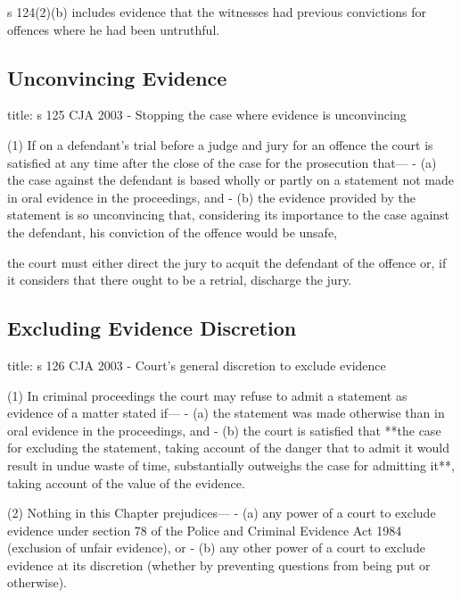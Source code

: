 \documentclass[
]{article}
\newenvironment{Shaded}{}{}
\newcommand{\NormalTok}[1]{#1}
\begin{document}
s 124(2)(b) includes evidence that the witnesses had previous
convictions for offences where he had been untruthful.

\hypertarget{unconvincing-evidence}{%
\subsection{Unconvincing Evidence}\label{unconvincing-evidence}}

\begin{Shaded}
\begin{Highlighting}[]
\NormalTok{title: s 125 CJA 2003 {-} Stopping the case where evidence is unconvincing}

\NormalTok{(1) If on a defendant’s trial before a judge and jury for an offence the court is satisfied at any time after the close of the case for the prosecution that—}
\NormalTok{{-} (a) the case against the defendant is based wholly or partly on a statement not made in oral evidence in the proceedings, and}
\NormalTok{{-} (b) the evidence provided by the statement is so unconvincing that, considering its importance to the case against the defendant, his conviction of the offence would be unsafe,}

\NormalTok{the court must either direct the jury to acquit the defendant of the offence or, if it considers that there ought to be a retrial, discharge the jury. }
\end{Highlighting}
\end{Shaded}

\hypertarget{excluding-evidence-discretion}{%
\subsection{Excluding Evidence
Discretion}\label{excluding-evidence-discretion}}

\begin{Shaded}
\begin{Highlighting}[]
\NormalTok{title: s 126 CJA 2003 {-} Court’s general discretion to exclude evidence}

\NormalTok{(1) In criminal proceedings the court may refuse to admit a statement as evidence of a matter stated if—}
\NormalTok{{-} (a) the statement was made otherwise than in oral evidence in the proceedings, and}
\NormalTok{{-} (b) the court is satisfied that **the case for excluding the statement, taking account of the danger that to admit it would result in undue waste of time, substantially outweighs the case for admitting it**, taking account of the value of the evidence.}

\NormalTok{(2) Nothing in this Chapter prejudices—}
\NormalTok{{-} (a) any power of a court to exclude evidence under section 78 of the Police and Criminal Evidence Act 1984 (exclusion of unfair evidence), or}
\NormalTok{{-} (b) any other power of a court to exclude evidence at its discretion (whether by preventing questions from being put or otherwise).}
\end{Highlighting}
\end{Shaded}
\end{document}
